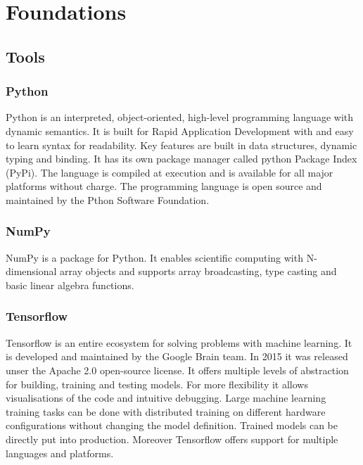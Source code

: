 \chapter{Foundations}

\section{Tools}

\subsection*{Python}

Python is an interpreted, object-oriented, high-level programming language with dynamic semantics.
It is built for Rapid Application Development with and easy to learn syntax for readability.
Key features are built in data structures, dynamic typing and binding.
\cite{python-lang}
It has its own package manager called python Package Index (PyPi).
The language is compiled at execution and is available for all major platforms without charge.
The programming language is open source and maintained by the Pthon Software Foundation.
\cite{python-software-foundation}


\subsection*{NumPy}

NumPy is a package for Python.
It enables scientific computing with N-dimensional array objects and supports array broadcasting, type casting and basic linear algebra functions.
\cite{numpy-package}


\subsection*{Tensorflow}

Tensorflow is an entire ecosystem for solving problems with machine learning.
It is developed and maintained by the Google Brain team.
In 2015 it was released unser the Apache 2.0 open-source license.
It offers multiple levels of abstraction for building, training and testing models.
For more flexibility it allows visualisations of the code and intuitive debugging.
Large machine learning training tasks can be done with distributed training on different hardware configurations without changing the model definition.
Trained models can be directly put into production.
Moreover Tensorflow offers support for multiple languages and platforms.
\cite{tensorflow-about}


